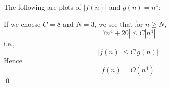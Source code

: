 The following are plots of $|f(n)|$ and $g(n) = n^4$:


If we choose $C = 8$ and $N = 3$,
we see that for $n \geq N$,
\[
\left|
7n^{4} + 20
\right| 
\leq C
\left|
n^4
\right|
\]
i.e.,
\[
|f(n)| \leq C|g(n)|
\]
Hence
\[
f(n) = O(n^4)
\]
\qed
